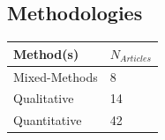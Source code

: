 \documentclass[]{tufte-handout}
\begin{document}
\subsection{Methodologies}\label{methodologies}

\begin{longtable}[]{@{}ll@{}}
\toprule
\begin{minipage}[b]{0.21\columnwidth}\raggedright\strut
Method(s)\strut
\end{minipage} & \begin{minipage}[b]{0.21\columnwidth}\raggedright\strut
\(N_{Articles}\)\strut
\end{minipage}\tabularnewline
\midrule
\endhead
\begin{minipage}[t]{0.21\columnwidth}\raggedright\strut
Mixed-Methods\strut
\end{minipage} & \begin{minipage}[t]{0.21\columnwidth}\raggedright\strut
8\strut
\end{minipage}\tabularnewline
\begin{minipage}[t]{0.21\columnwidth}\raggedright\strut
Qualitative\strut
\end{minipage} & \begin{minipage}[t]{0.21\columnwidth}\raggedright\strut
14\strut
\end{minipage}\tabularnewline
\begin{minipage}[t]{0.21\columnwidth}\raggedright\strut
Quantitative\strut
\end{minipage} & \begin{minipage}[t]{0.21\columnwidth}\raggedright\strut
42\strut
\end{minipage}\tabularnewline
\bottomrule
\end{longtable}
\end{document}

